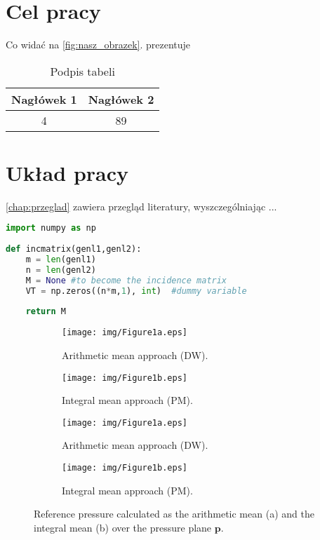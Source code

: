 \section{Cel pracy}

Co widać na \cref{fig:nasz_obrazek}.  prezentuje

\begin{table}[b]%
    \centering
    \caption{Podpis tabeli}
    \begin{tabular}{|c|c||}
        \hline
        \textbf{Nagłówek 1} & \textbf{Nagłówek 2 } \\ \hline
        4 & 89  \\ \hline
    \end{tabular}
    \label{tab:nasza_tabela}
\end{table}
\section{Układ pracy}

\cref{chap:przeglad} zawiera przegląd literatury, wyszczególniając ...

\begin{minipage}{\linewidth} %
\begin{lstlisting}[language=Python,caption={Opis kodu},captionpos=b,label={lst:kod}]
import numpy as np
    
def incmatrix(genl1,genl2):
    m = len(genl1)
    n = len(genl2)
    M = None #to become the incidence matrix
    VT = np.zeros((n*m,1), int)  #dummy variable
    
    return M
\end{lstlisting}
\end{minipage}


\begin{figure}
    \centering
    \begin{subfigure}[b]{0.48\textwidth}
        \texttt{[image: img/Figure1a.eps]}
        \caption{Arithmetic mean approach (DW).}
        \label{fig:refpresdw}
    \end{subfigure}
    \begin{subfigure}[b]{0.48\textwidth}
        \texttt{[image: img/Figure1b.eps]}
        \caption{Integral mean approach (PM).}
        \label{fig:refprespm}
    \end{subfigure}
    \begin{subfigure}[b]{0.48\textwidth}
        \texttt{[image: img/Figure1a.eps]}
        \caption{Arithmetic mean approach (DW).}
        \label{fig:refpresdw2}
    \end{subfigure}
    \begin{subfigure}[b]{0.48\textwidth}
        \texttt{[image: img/Figure1b.eps]}
        \caption{Integral mean approach (PM).}
        \label{fig:refprespm2}
    \end{subfigure}
    \caption{Reference pressure calculated as the arithmetic mean (a) and the integral mean (b) over the pressure plane $\mathbf{p}$.}\label{fig:refpres}
\end{figure}